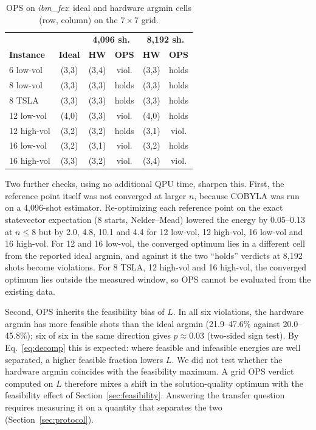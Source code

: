\documentclass[conference]{IEEEtran}
\begin{document}
\begin{table}[htbp]
\caption{OPS on \textit{ibm\_fez}: ideal and hardware argmin cells
(row, column) on the $7{\times}7$ grid.}
\label{tab:ops}
\begin{center}
\begin{tabular}{@{}lccccc@{}}
\toprule
& & \multicolumn{2}{c}{\textbf{4{,}096 sh.}} & \multicolumn{2}{c}{\textbf{8{,}192 sh.}} \\
\textbf{Instance} & \textbf{Ideal} & \textbf{HW} & \textbf{OPS} & \textbf{HW} & \textbf{OPS} \\
\midrule
6 low-vol   & (3,3) & (3,4) & viol. & (3,3) & holds \\
8 low-vol   & (3,3) & (3,3) & holds & (3,3) & holds \\
8 TSLA      & (3,3) & (3,3) & holds & (3,3) & holds \\
12 low-vol  & (4,0) & (3,3) & viol. & (4,0) & holds \\
12 high-vol & (3,2) & (3,2) & holds & (3,1) & viol. \\
16 low-vol  & (3,2) & (3,1) & viol. & (3,2) & holds \\
16 high-vol & (3,3) & (3,2) & viol. & (3,4) & viol. \\
\bottomrule
\end{tabular}
\end{center}
\end{table}

Two further checks, using no additional QPU time, sharpen this.
First, the reference point itself was not converged at larger $n$,
because COBYLA was run on a 4{,}096-shot estimator. Re-optimizing
each reference point on the exact statevector expectation (8 starts,
Nelder--Mead) lowered the energy by 0.05--0.13 at $n{\le}8$ but by 2.0,
4.8, 10.1 and 4.4 for 12 low-vol, 12 high-vol, 16 low-vol and 16
high-vol. For 12 and 16 low-vol, the converged optimum lies in a
different cell from the reported ideal argmin, and against it the two
``holds'' verdicts at 8{,}192 shots become violations. For 8 TSLA, 12
high-vol and 16 high-vol, the converged optimum lies outside the
measured window, so OPS cannot be evaluated from the existing data.

Second, OPS inherits the feasibility bias of $L$. In all six
violations, the hardware argmin has more feasible shots than the ideal
argmin (21.9--47.6\% against 20.0--45.8\%); six of six in the same
direction gives $p\approx0.03$ (two-sided sign test). By
Eq.~\eqref{eq:decomp} this is expected: where feasible and infeasible
energies are well separated, a higher feasible fraction lowers $L$. We
did not test whether the hardware argmin coincides with the
feasibility maximum.
A grid OPS verdict computed on $L$ therefore mixes a shift in the
solution-quality optimum with the feasibility effect of
Section~\ref{sec:feasibility}. Answering the transfer question requires
measuring it on a quantity that separates the two
(Section~\ref{sec:protocol}).
\end{document}
